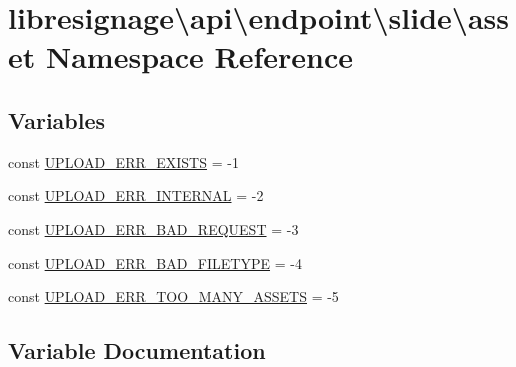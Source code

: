 \hypertarget{namespacelibresignage_1_1api_1_1endpoint_1_1slide_1_1asset}{}\section{libresignage\textbackslash{}api\textbackslash{}endpoint\textbackslash{}slide\textbackslash{}asset Namespace Reference}
\label{namespacelibresignage_1_1api_1_1endpoint_1_1slide_1_1asset}
\subsection*{Variables}
\begin{DoxyCompactItemize}
\item 
const \hyperlink{namespacelibresignage_1_1api_1_1endpoint_1_1slide_1_1asset_afc32bfc0e78ad6a761685aff9d0f1809}{U\+P\+L\+O\+A\+D\+\_\+\+E\+R\+R\+\_\+\+E\+X\+I\+S\+TS} = -\/1
\item 
const \hyperlink{namespacelibresignage_1_1api_1_1endpoint_1_1slide_1_1asset_a0d1e56bfad2c1a2132a4f3e23050983b}{U\+P\+L\+O\+A\+D\+\_\+\+E\+R\+R\+\_\+\+I\+N\+T\+E\+R\+N\+AL} = -\/2
\item 
const \hyperlink{namespacelibresignage_1_1api_1_1endpoint_1_1slide_1_1asset_a347dbb92e7094848d6b67477471431f9}{U\+P\+L\+O\+A\+D\+\_\+\+E\+R\+R\+\_\+\+B\+A\+D\+\_\+\+R\+E\+Q\+U\+E\+ST} = -\/3
\item 
const \hyperlink{namespacelibresignage_1_1api_1_1endpoint_1_1slide_1_1asset_a11462e6b8d458961fbfde1d8c1bf0b8c}{U\+P\+L\+O\+A\+D\+\_\+\+E\+R\+R\+\_\+\+B\+A\+D\+\_\+\+F\+I\+L\+E\+T\+Y\+PE} = -\/4
\item 
const \hyperlink{namespacelibresignage_1_1api_1_1endpoint_1_1slide_1_1asset_ac3f206ae3a66f2d8b53038412b62108c}{U\+P\+L\+O\+A\+D\+\_\+\+E\+R\+R\+\_\+\+T\+O\+O\+\_\+\+M\+A\+N\+Y\+\_\+\+A\+S\+S\+E\+TS} = -\/5
\end{DoxyCompactItemize}


\subsection{Variable Documentation}
\mbox{\label{namespacelibresignage_1_1api_1_1endpoint_1_1slide_1_1asset_a11462e6b8d458961fbfde1d8c1bf0b8c}} 
